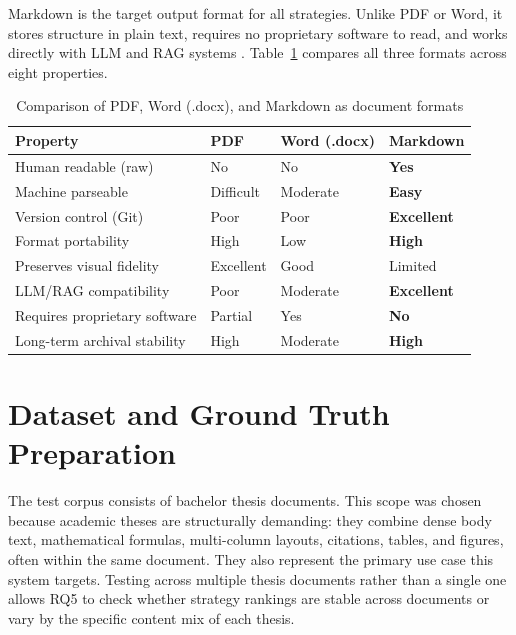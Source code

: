 Markdown is the target output format for all strategies. Unlike PDF or Word, it
stores structure in plain text, requires no proprietary software to read, and
works directly with LLM and RAG systems \autocite{cone2019, khan2024}.
Table~\ref{tab:format_comparison} compares all three formats across eight
properties.

\begin{table}[ht]
\centering
\caption{Comparison of PDF, Word (.docx), and Markdown as document formats}
\label{tab:format_comparison}
\renewcommand{\arraystretch}{1.4}
\begin{tabularx}{\textwidth}{lXXX}
\toprule
\textbf{Property} & \textbf{PDF} & \textbf{Word (.docx)} & \textbf{Markdown} \\
\midrule
Human readable (raw) & No & No & \textbf{Yes} \\
Machine parseable & Difficult & Moderate & \textbf{Easy} \\
Version control (Git) & Poor & Poor & \textbf{Excellent} \\
Format portability & High & Low & \textbf{High} \\
Preserves visual fidelity & Excellent & Good & Limited \\
LLM/RAG compatibility & Poor & Moderate & \textbf{Excellent} \\
Requires proprietary software & Partial & Yes & \textbf{No} \\
Long-term archival stability & High & Moderate & \textbf{High} \\
\bottomrule
\end{tabularx}
\end{table}

\section{Dataset and Ground Truth Preparation}

The test corpus consists of bachelor thesis documents. This scope
was chosen because academic theses are structurally demanding: they combine
dense body text, mathematical formulas, multi-column layouts, citations, tables,
and figures, often within the same document. They also represent the primary
use case this system targets. Testing across multiple thesis documents rather
than a single one allows RQ5 to check whether strategy rankings are stable
across documents or vary by the specific content mix of each thesis.

